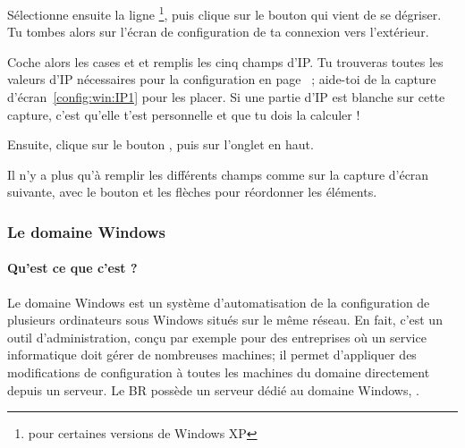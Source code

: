 

Sélectionne ensuite la ligne 
\footnote{ pour certaines versions de Windows XP},
puis clique sur le bouton  qui vient de se
dégriser. Tu tombes alors sur l'écran de configuration de ta
connexion vers l'extérieur.

Coche alors les cases  et  et remplis les cinq champs d'IP. Tu
trouveras toutes les valeurs d'IP nécessaires pour la configuration en page~\pageref{tableau:mon_IP} ; aide-toi de la capture
d'écran~\ref{config:win:IP1} pour les placer. Si une partie d'IP est blanche sur cette capture, c'est qu'elle t'est personnelle et que tu dois la
calculer !

Ensuite, clique sur le bouton , puis sur l'onglet
 en haut.


Il n'y a plus qu'à remplir les différents champs comme sur la
capture d'écran suivante, avec le bouton  et les
flèches pour réordonner les éléments.


\subsubsection{Le domaine Windows}

\paragraph{Qu'est ce que c'est ?}
Le domaine Windows est un système d'automatisation de la
configuration de plusieurs ordinateurs sous Windows situés sur le
même réseau. En fait, c'est un outil d'administration, con\c{c}u par
exemple pour des entreprises o\`u un service informatique doit gérer
de nombreuses machines; il permet d'appliquer des modifications de
configuration à toutes les machines du domaine directement depuis un
serveur. Le BR possède un serveur dédié au domaine Windows,
.


